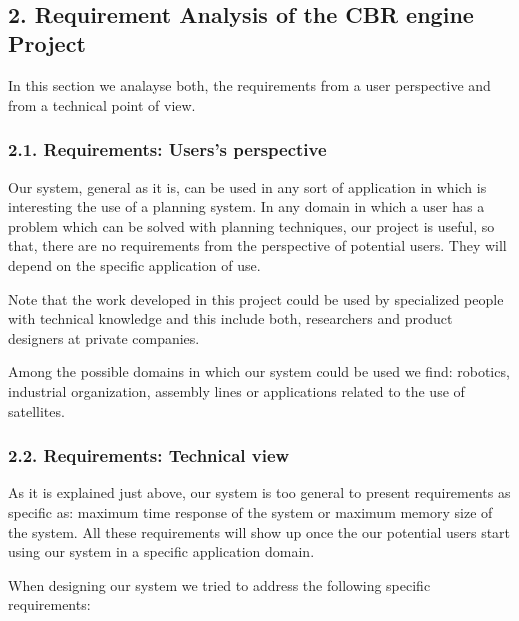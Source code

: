 \documentclass[11pt]{article}
\begin{document}
    \begin{center}
    \end{center}
    { \hspace*{\fill} \\}
    
    \subsection{2. Requirement Analysis of the CBR engine
Project}\label{requirement-analysis-of-the-cbr-engine-project}

In this section we analayse both, the requirements from a user
perspective and from a technical point of view.

\subsubsection{2.1. Requirements: Users's
perspective}\label{requirements-userss-perspective}

Our system, general as it is, can be used in any sort of application in
which is interesting the use of a planning system. In any domain in
which a user has a problem which can be solved with planning techniques,
our project is useful, so that, there are no requirements from the
perspective of potential users. They will depend on the specific
application of use.

Note that the work developed in this project could be used by
specialized people with technical knowledge and this include both,
researchers and product designers at private companies.

Among the possible domains in which our system could be used we find:
robotics, industrial organization, assembly lines or applications
related to the use of satellites.

\subsubsection{2.2. Requirements: Technical
view}\label{requirements-technical-view}

As it is explained just above, our system is too general to present
requirements as specific as: maximum time response of the system or
maximum memory size of the system. All these requirements will show up
once the our potential users start using our system in a specific
application domain.

When designing our system we tried to address the following specific
requirements:
\end{document}
